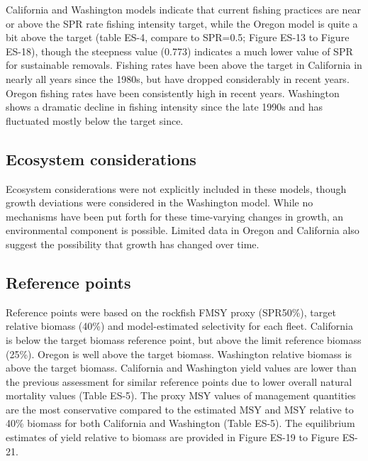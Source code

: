 \documentclass[11pt,
  english,
  letterpaper,
]{article}
\begin{document}
California and Washington models indicate that current fishing practices are near or above the SPR rate fishing intensity target, while the Oregon model is quite a bit above the target (table ES-4, compare to SPR=0.5; Figure ES-13 to Figure ES-18), though the steepness value (0.773) indicates a much lower value of SPR for sustainable removals. Fishing rates have been above the target in California in nearly all years since the 1980s, but have dropped considerably in recent years. Oregon fishing rates have been consistently high in recent years. Washington shows a dramatic decline in fishing intensity since the late 1990s and has fluctuated mostly below the target since.

\hypertarget{ecosystem-considerations}{%
\subsection*{Ecosystem considerations}\label{ecosystem-considerations}}

Ecosystem considerations were not explicitly included in these models, though growth deviations were considered in the Washington model. While no mechanisms have been put forth for these time-varying changes in growth, an environmental component is possible. Limited data in Oregon and California also suggest the possibility that growth has changed over time.

\hypertarget{reference-points}{%
\subsection*{Reference points}\label{reference-points}}

Reference points were based on the rockfish FMSY proxy (SPR50\%), target relative biomass (40\%) and model-estimated selectivity for each fleet. California is below the target biomass reference point, but above the limit reference biomass (25\%). Oregon is well above the target biomass. Washington relative biomass is above the target biomass. California and Washington yield values are lower than the previous assessment for similar reference points due to lower overall natural mortality values (Table ES-5). The proxy MSY values of management quantities are the most conservative compared to the estimated MSY and MSY relative to 40\% biomass for both California and Washington (Table ES-5). The equilibrium estimates of yield relative to biomass are provided in Figure ES-19 to Figure ES-21.
\end{document}
